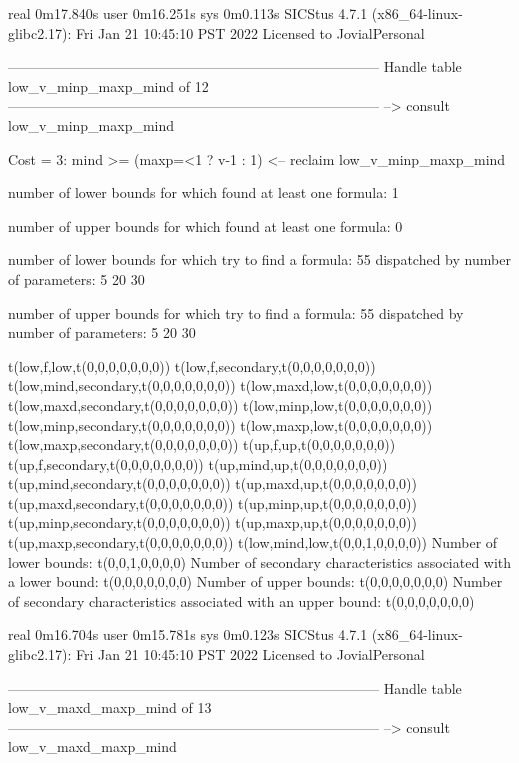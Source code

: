 real	0m17.840s
user	0m16.251s
sys	0m0.113s
SICStus 4.7.1 (x86_64-linux-glibc2.17): Fri Jan 21 10:45:10 PST 2022
Licensed to JovialPersonal


--------------------------------------------------------------------------------
Handle table low_v_minp_maxp_mind of 12
--------------------------------------------------------------------------------
--> consult low_v_minp_maxp_mind

Cost =  3:  mind >= (maxp=<1 ? v-1 : 1)
<-- reclaim low_v_minp_maxp_mind

number of lower bounds for which found at least one formula: 1

number of upper bounds for which found at least one formula: 0

number of lower bounds for which try to find a formula: 55
dispatched by number of parameters: 5  20  30

number of upper bounds for which try to find a formula: 55
dispatched by number of parameters: 5  20  30

t(low,f,low,t(0,0,0,0,0,0,0))
t(low,f,secondary,t(0,0,0,0,0,0,0))
t(low,mind,secondary,t(0,0,0,0,0,0,0))
t(low,maxd,low,t(0,0,0,0,0,0,0))
t(low,maxd,secondary,t(0,0,0,0,0,0,0))
t(low,minp,low,t(0,0,0,0,0,0,0))
t(low,minp,secondary,t(0,0,0,0,0,0,0))
t(low,maxp,low,t(0,0,0,0,0,0,0))
t(low,maxp,secondary,t(0,0,0,0,0,0,0))
t(up,f,up,t(0,0,0,0,0,0,0))
t(up,f,secondary,t(0,0,0,0,0,0,0))
t(up,mind,up,t(0,0,0,0,0,0,0))
t(up,mind,secondary,t(0,0,0,0,0,0,0))
t(up,maxd,up,t(0,0,0,0,0,0,0))
t(up,maxd,secondary,t(0,0,0,0,0,0,0))
t(up,minp,up,t(0,0,0,0,0,0,0))
t(up,minp,secondary,t(0,0,0,0,0,0,0))
t(up,maxp,up,t(0,0,0,0,0,0,0))
t(up,maxp,secondary,t(0,0,0,0,0,0,0))
t(low,mind,low,t(0,0,1,0,0,0,0))
Number of lower bounds:                                             t(0,0,1,0,0,0,0)
Number of secondary characteristics associated with a lower bound:  t(0,0,0,0,0,0,0)
Number of upper bounds:                                             t(0,0,0,0,0,0,0)
Number of secondary characteristics associated with an upper bound: t(0,0,0,0,0,0,0)

real	0m16.704s
user	0m15.781s
sys	0m0.123s
SICStus 4.7.1 (x86_64-linux-glibc2.17): Fri Jan 21 10:45:10 PST 2022
Licensed to JovialPersonal


--------------------------------------------------------------------------------
Handle table low_v_maxd_maxp_mind of 13
--------------------------------------------------------------------------------
--> consult low_v_maxd_maxp_mind

